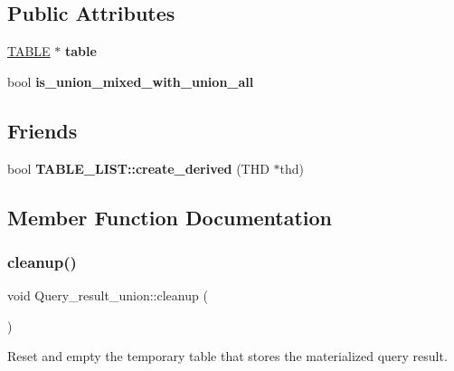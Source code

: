 \subsection*{Public Attributes}
\begin{DoxyCompactItemize}
\item 
\mbox{\label{classQuery__result__union_a990651c7bcdacb10625249bd84bba9fa}} 
\mbox{\hyperlink{structTABLE}{T\+A\+B\+LE}} $\ast$ {\bfseries table}
\item 
\mbox{\label{classQuery__result__union_a50fe9e5d0da2b73b0c8c549dcb5cf925}} 
bool {\bfseries is\+\_\+union\+\_\+mixed\+\_\+with\+\_\+union\+\_\+all}
\end{DoxyCompactItemize}
\subsection*{Friends}
\begin{DoxyCompactItemize}
\item 
\mbox{\label{classQuery__result__union_afaed536fb5d5548f269dc481d4f229f4}} 
bool {\bfseries T\+A\+B\+L\+E\+\_\+\+L\+I\+S\+T\+::create\+\_\+derived} (T\+HD $\ast$thd)
\end{DoxyCompactItemize}


\subsection{Member Function Documentation}
\mbox{\label{classQuery__result__union_aa4640fb9c092f60d01389ae784486863}} 
\subsubsection{\texorpdfstring{cleanup()}{cleanup()}}
{\footnotesize\ttfamily void Query\+\_\+result\+\_\+union\+::cleanup (\begin{DoxyParamCaption}{ }\end{DoxyParamCaption})}

Reset and empty the temporary table that stores the materialized query result.

